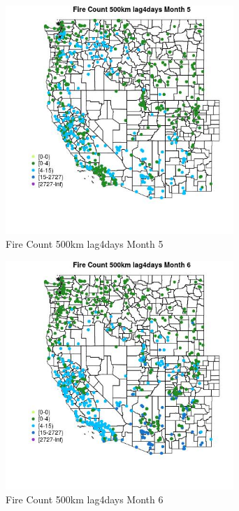 \begin{figure} 
\centering  
\includegraphics[width=0.77\textwidth]{Code_Outputs/Report_ML_input_PM25_Step4_part_f_de_duplicated_aveswNAs_MapObsMo5Fire_Count_500km_lag4days.jpg} 
\caption{\label{fig:Report_ML_input_PM25_Step4_part_f_de_duplicated_aveswNAsMapObsMo5Fire_Count_500km_lag4days}Fire Count 500km lag4days Month 5} 
\end{figure} 
 

\begin{figure} 
\centering  
\includegraphics[width=0.77\textwidth]{Code_Outputs/Report_ML_input_PM25_Step4_part_f_de_duplicated_aveswNAs_MapObsMo6Fire_Count_500km_lag4days.jpg} 
\caption{\label{fig:Report_ML_input_PM25_Step4_part_f_de_duplicated_aveswNAsMapObsMo6Fire_Count_500km_lag4days}Fire Count 500km lag4days Month 6} 
\end{figure} 
 


